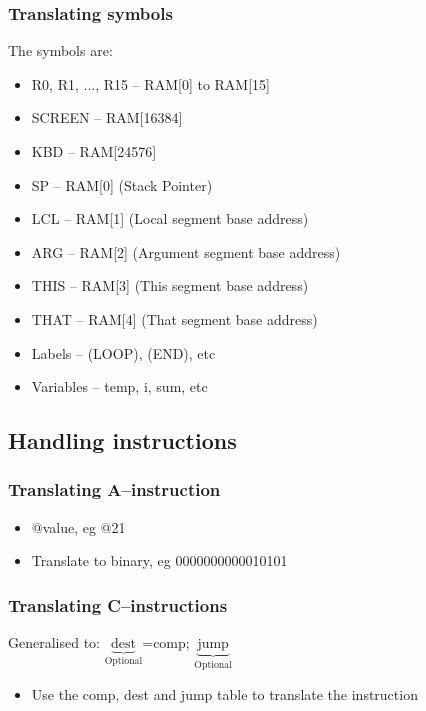 \documentclass[12pt,a4paper]{article}
\begin{document}
\subsubsection{Translating symbols}
The symbols are:
\begin{itemize}
    \item R0, R1, ..., R15 -- RAM[0] to RAM[15]
    \item SCREEN -- RAM[16384]
    \item KBD -- RAM[24576]
    \item SP -- RAM[0] (Stack Pointer)
    \item LCL -- RAM[1] (Local segment base address)
    \item ARG -- RAM[2] (Argument segment base address)
    \item THIS -- RAM[3] (This segment base address)
    \item THAT -- RAM[4] (That segment base address)
\end{itemize}
\begin{itemize}
    \item Labels -- (LOOP), (END), etc
    \item Variables -- temp, i, sum, etc
\end{itemize}

\subsection{Handling instructions}
\subsubsection{Translating A--instruction}
\begin{itemize}
    \item @value, eg @21
    \item Translate to binary, eg 0000000000010101
\end{itemize}

\subsubsection{Translating C--instructions}
Generalised to: $\underbrace{\text{dest}}_{\text{Optional}}$=comp; $\underbrace{\text{jump}}_{\text{Optional}}$
\begin{itemize}
    \item Use the comp, dest and jump table to translate the instruction
\end{itemize}
\end{document}
